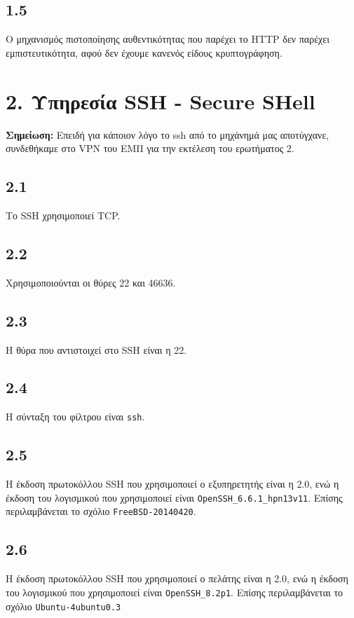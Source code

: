 		\subsection*{1.5}
			Ο μηχανισμός πιστοποίησης αυθεντικότητας που παρέχει το HTTP δεν παρέχει εμπιστευτικότητα, αφού δεν έχουμε κανενός είδους κρυπτογράφηση.
	
	\section*{2. Υπηρεσία SSH - Secure SHell}
		\textbf{Σημείωση:} Επειδή για κάποιον λόγο το ssh από το μηχάνημά μας αποτύγχανε, συνδεθήκαμε στο VPN του ΕΜΠ για την εκτέλεση του ερωτήματος 2.
	
		\subsection*{2.1}
			Το SSH χρησιμοποιεί TCP.
	
		\subsection*{2.2}
			Χρησιμοποιούνται οι θύρες 22 και 46636.
	
		\subsection*{2.3}
			Η θύρα που αντιστοιχεί στο SSH είναι η 22.
	
		\subsection*{2.4}
			Η σύνταξη του φίλτρου είναι \verb|ssh|.
	
		\subsection*{2.5}
			Η έκδοση πρωτοκόλλου SSH που χρησιμοποιεί ο εξυπηρετητής είναι η 2.0, ενώ η έκδοση του λογισμικού που χρησιμοποιεί είναι \verb|OpenSSH_6.6.1_hpn13v11|. Επίσης περιλαμβάνεται το σχόλιο  \verb|FreeBSD-20140420|.
	
		\subsection*{2.6}
			Η έκδοση πρωτοκόλλου SSH που χρησιμοποιεί ο πελάτης είναι η 2.0, ενώ η έκδοση του λογισμικού που χρησιμοποιεί είναι \verb|OpenSSH_8.2p1|. Επίσης περιλαμβάνεται το σχόλιο \verb|Ubuntu-4ubuntu0.3|
	
